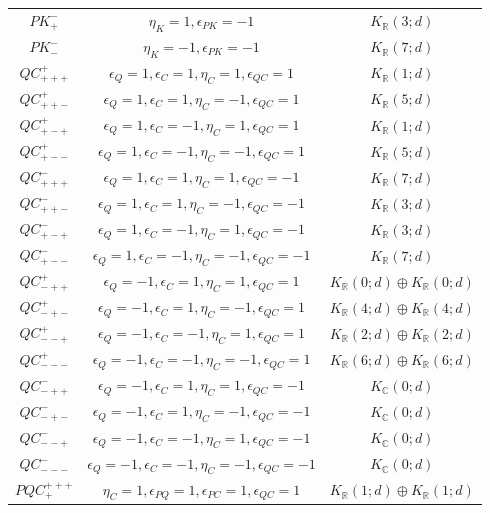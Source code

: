 \documentclass{tADP2e}
\theoremstyle{plain}
\theoremstyle{plain}
\theoremstyle{definition}
\begin{document}
\begin{appendices}
\begin{table}[tbp]
\begin{center}
\begin{tabular}{ccc}
$PK^-_+$ & %
$\eta_K=1,\epsilon_{PK}=-1$ & $K_{\mathbb{R}}(3;d)$ \\
$PK^-_-$ & %
$\eta_K=-1,\epsilon_{PK}=-1$ & $K_{\mathbb{R}}(7;d)$ \\
$QC^+_{+++}$ & $\epsilon_Q=1,\epsilon_C=1,\eta_C=1,\epsilon_{QC}=1$ & $K_{\mathbb{R}}(1;d)$ \\
$QC^+_{++-}$ & $\epsilon_Q=1,\epsilon_C=1,\eta_C=-1,\epsilon_{QC}=1$ & $K_{\mathbb{R}}(5;d)$ \\
$QC^+_{+-+}$ & $\epsilon_Q=1,\epsilon_C=-1,\eta_C=1,\epsilon_{QC}=1$ & $K_{\mathbb{R}}(1;d)$ \\
$QC^+_{+--}$ & $\epsilon_Q=1,\epsilon_C=-1,\eta_C=-1,\epsilon_{QC}=1$ & $K_{\mathbb{R}}(5;d)$ \\
$QC^-_{+++}$ & $\epsilon_Q=1,\epsilon_C=1,\eta_C=1,\epsilon_{QC}=-1$ & $K_{\mathbb{R}}(7;d)$ \\
$QC^-_{++-}$ & $\epsilon_Q=1,\epsilon_C=1,\eta_C=-1,\epsilon_{QC}=-1$ & $K_{\mathbb{R}}(3;d)$ \\
$QC^-_{+-+}$ & $\epsilon_Q=1,\epsilon_C=-1,\eta_C=1,\epsilon_{QC}=-1$ & $K_{\mathbb{R}}(3;d)$ \\
$QC^-_{+--}$ & $\epsilon_Q=1,\epsilon_C=-1,\eta_C=-1,\epsilon_{QC}=-1$ & $K_{\mathbb{R}}(7;d)$ \\
$QC^+_{-++}$ & $\epsilon_Q=-1,\epsilon_C=1,\eta_C=1,\epsilon_{QC}=1$ & $K_{\mathbb{R}}(0;d)\oplus K_{\mathbb{R}}(0;d)$ \\
$QC^+_{-+-}$ & $\epsilon_Q=-1,\epsilon_C=1,\eta_C=-1,\epsilon_{QC}=1$ & $K_{\mathbb{R}}(4;d)\oplus K_{\mathbb{R}}(4;d)$ \\
$QC^+_{--+}$ & $\epsilon_Q=-1,\epsilon_C=-1,\eta_C=1,\epsilon_{QC}=1$ & $K_{\mathbb{R}}(2;d)\oplus K_{\mathbb{R}}(2;d)$  \\
$QC^+_{---}$ & $\epsilon_Q=-1,\epsilon_C=-1,\eta_C=-1,\epsilon_{QC}=1$ & $K_{\mathbb{R}}(6;d)\oplus K_{\mathbb{R}}(6;d)$ \\
$QC^-_{-++}$ & $\epsilon_Q=-1,\epsilon_C=1,\eta_C=1,\epsilon_{QC}=-1$ & $K_{\mathbb{C}}(0;d)$ \\
$QC^-_{-+-}$ & $\epsilon_Q=-1,\epsilon_C=1,\eta_C=-1,\epsilon_{QC}=-1$ & $K_{\mathbb{C}}(0;d)$ \\
$QC^-_{--+}$ & $\epsilon_Q=-1,\epsilon_C=-1,\eta_C=1,\epsilon_{QC}=-1$ & $K_{\mathbb{C}}(0;d)$ \\
$QC^-_{---}$ & $\epsilon_Q=-1,\epsilon_C=-1,\eta_C=-1,\epsilon_{QC}=-1$ & $K_{\mathbb{C}}(0;d)$ \\
$PQC^{+++}_+$ & %
$\eta_C=1,\epsilon_{PQ}=1,\epsilon_{PC}=1,\epsilon_{QC}=1$ & $K_{\mathbb{R}}(1;d)\oplus K_{\mathbb{R}}(1;d)$ \\

\end{tabular}
\end{center}
\end{table}
\end{appendices}
\end{document}
